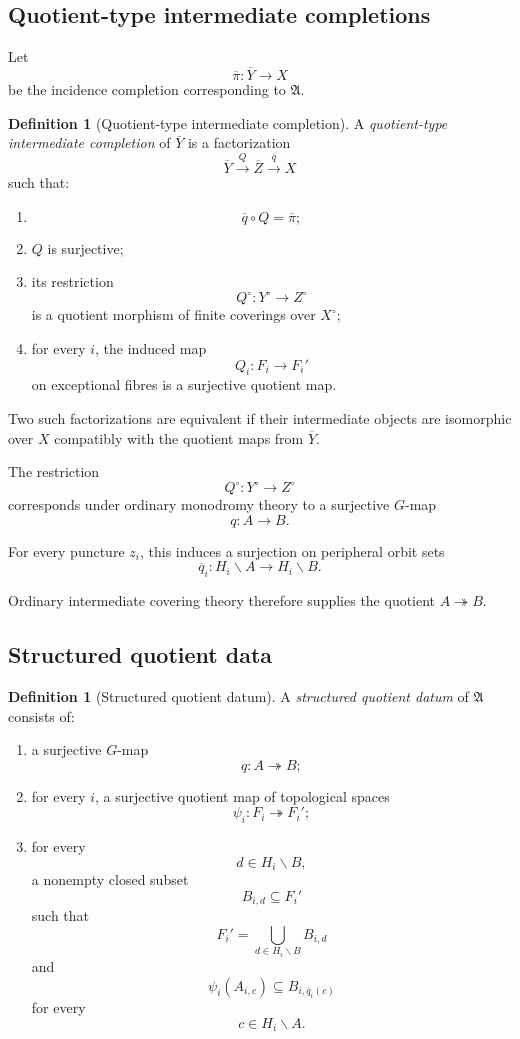 \documentclass[11pt]{article}
\theoremstyle{plain}
\theoremstyle{definition}
\newtheorem{definition}[theorem]{Definition}
\begin{document}
\subsection{Quotient-type intermediate completions}
\label{subsec:quotient-intermediate}

Let
\[
\overline\pi:
\overline Y\longrightarrow X
\]
be the incidence completion corresponding to $\mathfrak A$.

\begin{definition}[Quotient-type intermediate completion]
\label{def:quotient-intermediate}
A \emph{quotient-type intermediate completion} of $\overline Y$ is a
factorization
\[
\overline Y
\overset{Q}{\longrightarrow}
\overline Z
\overset{\overline q}{\longrightarrow}
X
\]
such that:
\begin{enumerate}[label=(\roman*)]
\item
\[
\overline q\circ Q=\overline\pi;
\]
\item $Q$ is surjective;
\item its restriction
\[
Q^\circ:Y^\circ\to Z^\circ
\]
is a quotient morphism of finite coverings over $X^\circ$;
\item for every $i$, the induced map
\[
Q_i:F_i\to F_i'
\]
on exceptional fibres is a surjective quotient map.
\end{enumerate}
Two such factorizations are equivalent if their intermediate objects are
isomorphic over $X$ compatibly with the quotient maps from
$\overline Y$.
\end{definition}

The restriction
\[
Q^\circ:Y^\circ\to Z^\circ
\]
corresponds under ordinary monodromy theory to a surjective $G$-map
\[
q:A\longrightarrow B.
\]

For every puncture $z_i$, this induces a surjection on peripheral orbit
sets
\[
\overline q_i:
H_i\backslash A
\longrightarrow
H_i\backslash B.
\]

Ordinary intermediate covering theory therefore supplies the quotient
$A\twoheadrightarrow B$.

\subsection{Structured quotient data}
\label{subsec:structured-quotient-data}

\begin{definition}[Structured quotient datum]
\label{def:structured-quotient-datum}
A \emph{structured quotient datum} of $\mathfrak A$ consists of:
\begin{enumerate}[label=(\roman*)]
\item a surjective $G$-map
\[
q:A\twoheadrightarrow B;
\]
\item for every $i$, a surjective quotient map of topological spaces
\[
\psi_i:F_i\twoheadrightarrow F_i';
\]
\item for every
\[
d\in H_i\backslash B,
\]
a nonempty closed subset
\[
B_{i,d}\subseteq F_i'
\]
such that
\[
F_i'
=
\bigcup_{d\in H_i\backslash B}B_{i,d}
\]
and
\[
\psi_i(A_{i,c})
\subseteq
B_{i,\overline q_i(c)}
\]
for every
\[
c\in H_i\backslash A.
\]
\end{enumerate}
\end{definition}
\end{document}

